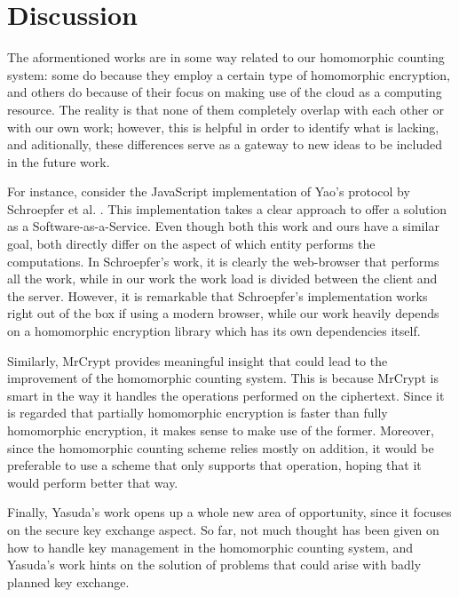 \section{Discussion}

The aformentioned works are in some way related to our homomorphic counting system: some do because they employ a certain type of homomorphic encryption, and others do because of their focus on making use of the cloud as a computing resource. The reality is that none of them completely overlap with each other or with our own work; however, this is helpful in order to identify what is lacking, and aditionally, these differences serve as a gateway to new ideas to be included in the future work.

For instance, consider the JavaScript implementation of Yao's protocol \cite{Yao:1986:GES:1382439.1382944} by Schroepfer et al. \cite{Schroepfer:2011:DSC:2046707.2093509}. This implementation takes a clear approach to offer a solution as a Software-as-a-Service. Even though both this work and ours have a similar goal, both directly differ on the aspect of which entity performs the computations. In Schroepfer's work, it is clearly the web-browser that performs all the work, while in our work the work load is divided between the client and the server. However, it is remarkable that Schroepfer's implementation works right out of the box if using a modern browser, while our work heavily depends on a homomorphic encryption library which has its own dependencies itself.

Similarly, MrCrypt \cite{Tetali:2013:MSA:2544173.2509554} provides meaningful insight that could lead to the improvement of the homomorphic counting system. This is because MrCrypt is smart in the way it handles the operations performed on the ciphertext. Since it is regarded that partially homomorphic encryption is faster than fully homomorphic encryption, it makes sense to make use of the former. Moreover, since the homomorphic counting scheme relies mostly on addition, it would be preferable to use a scheme that only supports that operation, hoping that it would perform better that way.

Finally, Yasuda's \cite{Yasuda:2015:SDD:2732516.2732521} work opens up a whole new area of opportunity, since it focuses on the secure key exchange aspect. So far, not much thought has been given on how to handle key management in the homomorphic counting system, and Yasuda's work hints on the solution of problems that could arise with badly planned key exchange.


